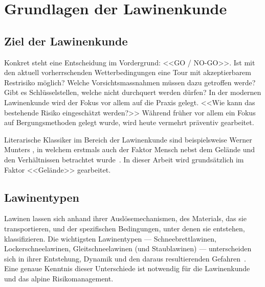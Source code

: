 \clearpage
\section{Grundlagen der Lawinenkunde}
\subsection{Ziel der Lawinenkunde}

Konkret steht eine Entscheidung im Vordergrund: <<GO / NO-GO>>. Ist mit den aktuell vorherrschenden Wetterbedingungen eine Tour mit akzeptierbarem Restrisiko möglich? Welche Vorsichtsmassnahmen müssen dazu getroffen werde? Gibt es Schlüsselstellen, welche nicht durchquert werden dürfen? In der modernen Lawinenkunde wird der Fokus vor allem auf die Praxis gelegt. <<Wie kann das bestehende Risiko eingeschätzt werden?>> Während früher vor allem ein Fokus auf Bergungsmethoden gelegt wurde, wird heute vermehrt präventiv gearbeitet.~\cite{harveyrhynerschweizerlawinenkunde}

Literarische Klassiker im Bereich der Lawinenkunde sind beispielsweise Werner Munters , in welchem erstmals auch der Faktor Mensch nebst dem Gelände und den Verhältnissen betrachtet wurde~\cite{munter}. In dieser Arbeit wird grundsätzlich im Faktor <<Gelände>> gearbeitet.


\subsection{Lawinentypen}

Lawinen lassen sich anhand ihrer Auslösemechanismen, des Materials, das sie transportieren, und der spezifischen Bedingungen, unter denen sie entstehen, klassifizieren. Die wichtigsten Lawinentypen --- Schneebrettlawinen, Lockerschneelawinen, Gleitschneelawinen (und Staublawinen) --- unterscheiden sich in ihrer Entstehung, Dynamik und den daraus resultierenden Gefahren~\cite{harveyrhynerschweizerlawinenkunde}. Eine genaue Kenntnis dieser Unterschiede ist notwendig für die Lawinenkunde und das alpine Risikomanagement.

